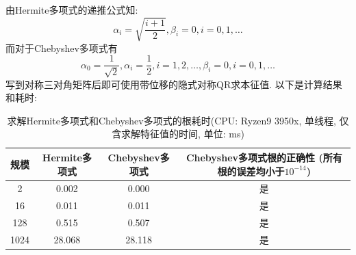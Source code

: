 \documentclass[UTF8]{ctexart}
\begin{document}
        \subsection{}
            \indent 由Hermite多项式的递推公式知:
            \begin{equation}
                \alpha_i=\sqrt{\dfrac{i+1}{2}},\beta_i=0,i=0,1,\dots
            \end{equation}
            而对于Chebyshev多项式有
            \begin{equation}
                \alpha_0=\dfrac{1}{\sqrt{2}},\alpha_i=\dfrac{1}{2},i=1,2,\dots,\beta_i=0,i=0,1,\dots
            \end{equation}
            写到对称三对角矩阵后即可使用带位移的隐式对称QR求本征值. 以下是计算结果和耗时:
            \begin{table}[H]
                \centering
                \caption{求解Hermite多项式和Chebyshev多项式的根耗时(CPU: Ryzen9 3950x, 单线程, 仅含求解特征值的时间, 单位: ms)}
                \begin{tabular}{|c|c|c|c|}
                    \hline
                    规模&Hermite多项式&Chebyshev多项式&Chebyshev多项式根的正确性 (所有根的误差均小于$10^{-14}$)\\
                    \hline
                    2&0.002&0.000&是\\
                    \hline
                    16&0.011&0.011&是\\
                    \hline
                    128&0.515&0.507&是\\
                    \hline
                    1024&28.068&28.118&是\\
                    \hline
                \end{tabular}
            \end{table}
\end{document}
